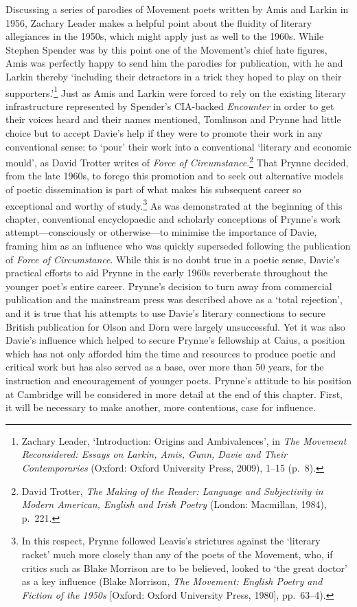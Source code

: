 \documentclass[]{article}
\begin{document}
Discussing a series of parodies of Movement poets written by Amis and
Larkin in 1956, Zachary Leader makes a helpful point about the fluidity
of literary allegiances in the 1950s, which might apply just as well to
the 1960s. While Stephen Spender was by this point one of the Movement’s
chief hate figures, Amis was perfectly happy to send him the parodies
for publication, with he and Larkin thereby ‘including their detractors
in a trick they hoped to play on their supporters.’\footnote{Zachary
  Leader, ‘Introduction: Origins and Ambivalences’, in \emph{The
  Movement Reconsidered: Essays on Larkin, Amis, Gunn, Davie and Their
  Contemporaries} (Oxford: Oxford University Press, 2009), 1–15 (p.~8).}
Just as Amis and Larkin were forced to rely on the existing literary
infrastructure represented by Spender’s CIA-backed \emph{Encounter} in
order to get their voices heard and their names mentioned, Tomlinson and
Prynne had little choice but to accept Davie’s help if they were to
promote their work in any conventional sense: to ‘pour’ their work into
a conventional ‘literary and economic mould’, as David Trotter writes of
\emph{Force of Circumstance}.\footnote{David Trotter, \emph{The Making
  of the Reader: Language and Subjectivity in Modern American, English
  and Irish Poetry} (London: Macmillan, 1984), p.~221.} That Prynne
decided, from the late 1960s, to forego this promotion and to seek out
alternative models of poetic dissemination is part of what makes his
subsequent career so exceptional and worthy of study.\footnote{In this
  respect, Prynne followed Leavis’s strictures against the ‘literary
  racket’ much more closely than any of the poets of the Movement, who,
  if critics such as Blake Morrison are to be believed, looked to ‘the
  great doctor’ as a key influence (Blake Morrison, \emph{The Movement:
  English Poetry and Fiction of the 1950s} {[}Oxford: Oxford University
  Press, 1980{]}, pp.~63–4).} As was demonstrated at the beginning of
this chapter, conventional encyclopaedic and scholarly conceptions of
Prynne’s work attempt—consciously or otherwise—to minimise the
importance of Davie, framing him as an influence who was quickly
superseded following the publication of \emph{Force of Circumstance}.
While this is no doubt true in a poetic sense, Davie’s practical efforts
to aid Prynne in the early 1960s reverberate throughout the younger
poet’s entire career. Prynne’s decision to turn away from commercial
publication and the mainstream press was described above as a ‘total
rejection’, and it is true that his attempts to use Davie’s literary
connections to secure British publication for Olson and Dorn were
largely unsuccessful. Yet it was also Davie’s influence which helped to
secure Prynne’s fellowship at Caius, a position which has not only
afforded him the time and resources to produce poetic and critical work
but has also served as a base, over more than 50 years, for the
instruction and encouragement of younger poets. Prynne’s attitude to his
position at Cambridge will be considered in more detail at the end of
this chapter. First, it will be necessary to make another, more
contentious, case for influence.
\end{document}
